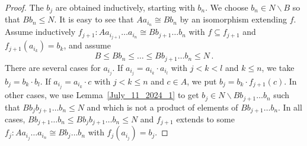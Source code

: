 \documentclass[a4paper, 11pt]{article}
\theoremstyle{note}
\begin{document}
\begin{proof}
	The $b_j$ are obtained inductively, starting with $b_n$. We choose $b_n\in N\smallsetminus B$ so that  $Bb_n\leq N$. It is easy to see that  $Aa_{i_n}\cong Bb_n$  by an isomorphism extending $f$.  Assume inductively  $f_{j+1}:Aa_{i_{j+1}}\ldots a_{i_n}\cong Bb_{j+1}\ldots b_n$ with  $f\subseteq f_{j+1}$  and  $f_{j+1}(a_{i_k})=b_k$, and assume 
	$$B\leq Bb_n\leq \ldots \leq Bb_{j+1}\ldots b_n\leq N \,.$$
	There are several cases  for $a_{i_j}$.  If $a_{i_j}= a_{i_k}\cdot a_{i_l}$  with  $j<k<l$ and $k\leq n$, we take $b_j =b_k\cdot b_l$. If $a_{i_j} = a_{i_k}\cdot c$  with $j<k\leq n$  and $c\in A$, we put  $b_j=b_k\cdot f_{j+1}(c)$. In other cases,  we use Lemma~\ref{July_11_2024_1} to get $b_j\in N\smallsetminus Bb_{j+1}\ldots b_n$ such that $Bb_jb_{j+1}\ldots b_n\leq N$ and which is not a product of elements of $Bb_{j+1}\ldots b_n$.  In all cases,  $Bb_{j+1}\ldots b_n\leq Bb_jb_{j+1}\ldots b_n\leq  N$  and  $f_{j+1}$ extends to some $f_j: Aa_{i_j}\ldots a_{i_n}\cong Bb_j\ldots b_n$  with $f_j(a_{i_j})=b_j$. 
	
	
	

\end{proof}
\end{document}

